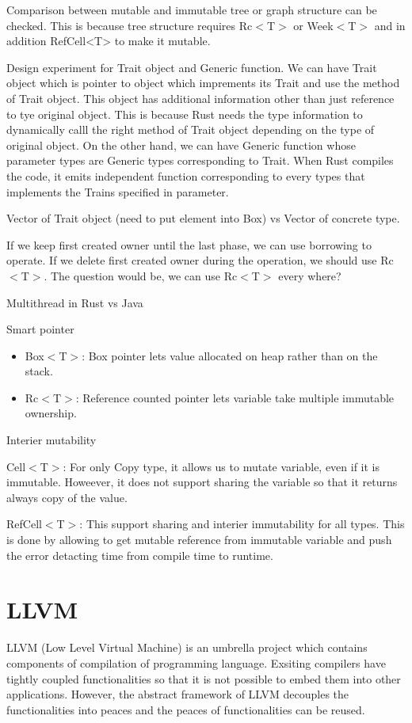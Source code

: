 Comparison between mutable and immutable tree or graph structure can be checked. 
This is because tree structure requires Rc$<$T$>$ or Week$<$T$>$ and in addition RefCell<T> to make it mutable.

Design experiment for Trait object and Generic function. 
We can have Trait object which is pointer to object which imprements its Trait and use the method of Trait object.
This object has additional information other than just reference to tye original object. 
This is because Rust needs the type information to dynamically calll the right method of Trait object depending on the type of 
original object.
On the other hand, we can have Generic function whose parameter types are Generic types corresponding to Trait. 
When Rust compiles the code, it emits independent function corresponding to every types that implements the Trains specified in parameter.

Vector of Trait object (need to put element into Box) vs Vector of concrete type.


If we keep first created owner until the last phase, we can use borrowing to operate.
If we delete first created owner during the operation, we should use Rc$<$T$>$.
The question would be, we can use Rc$<$T$>$ every where?

Multithread in Rust vs Java

Smart pointer
\begin{itemize}
    \item Box$<$T$>$: Box pointer lets value allocated on heap rather than on the stack.
    \item Rc$<$T$>$: Reference counted pointer lets variable take multiple immutable ownership.
\end{itemize}

Interier mutability
    \item Cell$<$T$>$: For only Copy type, it allows us to mutate variable, even if it is immutable. Howeever, it does not support sharing the variable so that it returns always copy of the value.
    \item RefCell$<$T$>$: This support sharing and interier immutability for all types. This is done by allowing to get mutable reference from immutable variable and push the error detacting time from compile time to runtime.
    

\section{LLVM}
\label{sec:history}
LLVM (Low Level Virtual Machine) is an umbrella project which contains components of compilation of programming language.
Exsiting compilers have tightly coupled functionalities so that it is not possible to embed them into other applications.
However, the abstract framework of LLVM decouples the functionalities into peaces and the peaces of functionalities can be reused.

